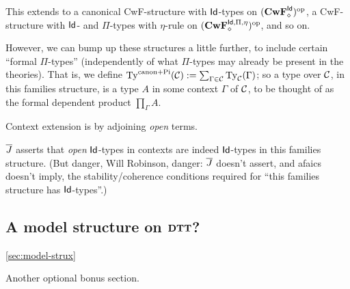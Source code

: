 \documentclass{amsart}
\begin{document}
This extends to a canonical CwF-structure with $\mathsf{Id}$-types on $(\mathbf{CwF}^{\mathsf{Id}}_\diamond)^{\mathrm{op}}$, a CwF-structure with $\mathsf{Id}$- and $\Pi$-types with $\eta$-rule on $(\mathbf{CwF}^{\mathsf{Id},\Pi,\eta}_\diamond)^{\mathrm{op}}$, and so on.

However, we can bump up these structures a little further, to include certain ``formal $\Pi$-types'' (independently of what $\Pi$-types may already be present in the theories).  That is, we define $\mathrm{Ty}^\mathrm{canon + Pi}(\mathcal{C}) := \sum_{\Gamma \in \mathcal{C}} \mathrm{Ty}_{\mathcal{C}}(\Gamma)$; so a type over $\mathcal{C}$, in this families structure, is a type $A$ in some context $\Gamma$ of $\mathcal{C}$, to be thought of as the formal dependent product $\prod_\Gamma A$.

Context extension is by adjoining \emph{open} terms.

$\overline{J}$ asserts that \emph{open} $\mathsf{Id}$-types in contexts are indeed $\mathsf{Id}$-types in this families structure.  (But danger, Will Robinson, danger: $\overline{J}$ doesn't assert, and afaics doesn't imply, the stability/coherence conditions required for ``this families structure has $\mathsf{Id}$-types''.)

\subsection{A model structure on $\mathbf{DTT}$?} \ref{sec:model-strux}

Another optional bonus section.

\clearpage













































\end{document}
